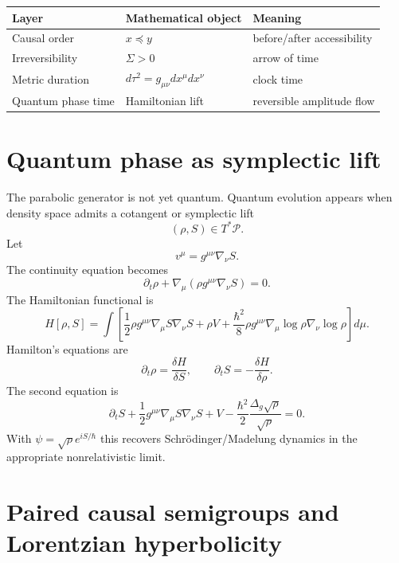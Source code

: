 \documentclass[11pt]{article}
\newcommand{\pre}{\preceq}
\begin{document}
\begin{center}
\begin{tabular}{lll}
\toprule
Layer & Mathematical object & Meaning\\
\midrule
Causal order & $x\pre y$ & before/after accessibility\\
Irreversibility & $\Sigma>0$ & arrow of time\\
Metric duration & $d\tau^2=g_{\mu\nu}dx^\mu dx^\nu$ & clock time\\
Quantum phase time & Hamiltonian lift & reversible amplitude flow\\
\bottomrule
\end{tabular}
\end{center}

\section{Quantum phase as symplectic lift}

The parabolic generator is not yet quantum. Quantum evolution appears when density space admits a cotangent or symplectic lift
\begin{equation}
(\rho,S)\in T^*\mathcal P.
\end{equation}
Let
\begin{equation}
 v^\mu=g^{\mu\nu}\nabla_\nu S.
\end{equation}
The continuity equation becomes
\begin{equation}
\partial_t\rho+\nabla_\mu(\rho g^{\mu\nu}\nabla_\nu S)=0.
\end{equation}
The Hamiltonian functional is
\begin{equation}
H[\rho,S]=\int\left[\frac12\rho g^{\mu\nu}\nabla_\mu S\nabla_\nu S+\rho V+\frac{\hbar^2}{8}\rho g^{\mu\nu}\nabla_\mu\log\rho\nabla_\nu\log\rho\right]d\mu.
\end{equation}
Hamilton's equations are
\begin{equation}
\partial_t\rho=\frac{\delta H}{\delta S},\qquad
\partial_t S=-\frac{\delta H}{\delta\rho}.
\end{equation}
The second equation is
\begin{equation}
\partial_t S+\frac12g^{\mu\nu}\nabla_\mu S\nabla_\nu S+V-\frac{\hbar^2}{2}\frac{\Delta_g\sqrt\rho}{\sqrt\rho}=0.
\end{equation}
With $\psi=\sqrt\rho e^{iS/\hbar}$ this recovers Schrödinger/Madelung dynamics in the appropriate nonrelativistic limit.

\section{Paired causal semigroups and Lorentzian hyperbolicity}
\end{document}
